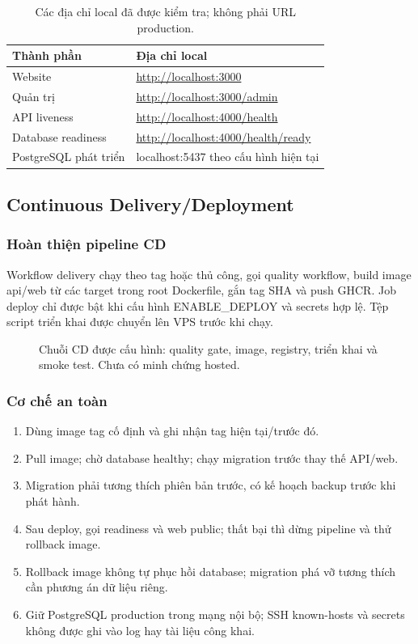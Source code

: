 \documentclass[12pt,a4paper]{article}
\begin{document}
\begin{table}[H]\centering\small
\begin{tabularx}{\textwidth}{P{4.0cm}Y}
\toprule\textbf{Thành phần}&\textbf{Địa chỉ local}\\\midrule
Website&\url{http://localhost:3000}\\
Quản trị&\url{http://localhost:3000/admin}\\
API liveness&\url{http://localhost:4000/health}\\
Database readiness&\url{http://localhost:4000/health/ready}\\
PostgreSQL phát triển&localhost:5437 theo cấu hình hiện tại\\
\bottomrule\end{tabularx}\caption{Các địa chỉ local đã được kiểm tra; không phải URL production.}
\end{table}

\subsection{Continuous Delivery/Deployment}
\subsubsection{Hoàn thiện pipeline CD}
Workflow delivery chạy theo tag hoặc thủ công, gọi quality workflow, build image api/web từ các target trong root Dockerfile, gắn tag SHA và push GHCR. Job deploy chỉ được bật khi cấu hình ENABLE\_DEPLOY và secrets hợp lệ. Tệp script triển khai được chuyển lên VPS trước khi chạy.

\begin{figure}[H]\centering

\caption{Chuỗi CD được cấu hình: quality gate, image, registry, triển khai và smoke test. Chưa có minh chứng hosted.}
\end{figure}

\subsubsection{Cơ chế an toàn}
\begin{enumerate}
\item Dùng image tag cố định và ghi nhận tag hiện tại/trước đó.
\item Pull image; chờ database healthy; chạy migration trước thay thế API/web.
\item Migration phải tương thích phiên bản trước, có kế hoạch backup trước khi phát hành.
\item Sau deploy, gọi readiness và web public; thất bại thì dừng pipeline và thử rollback image.
\item Rollback image không tự phục hồi database; migration phá vỡ tương thích cần phương án dữ liệu riêng.
\item Giữ PostgreSQL production trong mạng nội bộ; SSH known-hosts và secrets không được ghi vào log hay tài liệu công khai.
\end{enumerate}
\end{document}
